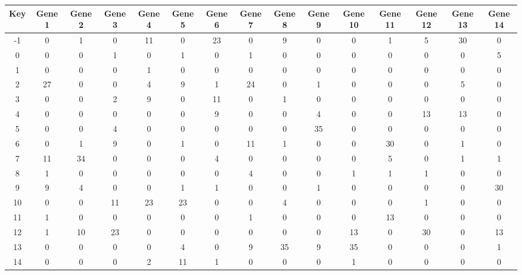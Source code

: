 \begin{tabular}{|c|c|c|c|c|c|c|c|c|c|c|c|c|c|c|}
\hline
Key & Gene 1 & Gene 2 & Gene 3 & Gene 4 & Gene 5 & Gene 6 & Gene 7 & Gene 8 & Gene 9 & Gene 10 & Gene 11 & Gene 12 & Gene 13 & Gene 14 \\
\hline
-1 & 0 & 1 & 0 & 11 & 0 & 23 & 0 & 9 & 0 & 0 & 1 & 5 & 30 & 0 \\
0 & 0 & 0 & 1 & 0 & 1 & 0 & 1 & 0 & 0 & 0 & 0 & 0 & 0 & 5 \\
1 & 0 & 0 & 0 & 1 & 0 & 0 & 0 & 0 & 0 & 0 & 0 & 0 & 0 & 0 \\
2 & 27 & 0 & 0 & 4 & 9 & 1 & 24 & 0 & 1 & 0 & 0 & 0 & 5 & 0 \\
3 & 0 & 0 & 2 & 9 & 0 & 11 & 0 & 1 & 0 & 0 & 0 & 0 & 0 & 0 \\
4 & 0 & 0 & 0 & 0 & 0 & 9 & 0 & 0 & 4 & 0 & 0 & 13 & 13 & 0 \\
5 & 0 & 0 & 4 & 0 & 0 & 0 & 0 & 0 & 35 & 0 & 0 & 0 & 0 & 0 \\
6 & 0 & 1 & 9 & 0 & 1 & 0 & 11 & 1 & 0 & 0 & 30 & 0 & 1 & 0 \\
7 & 11 & 34 & 0 & 0 & 0 & 4 & 0 & 0 & 0 & 0 & 5 & 0 & 1 & 1 \\
8 & 1 & 0 & 0 & 0 & 0 & 0 & 4 & 0 & 0 & 1 & 1 & 1 & 0 & 0 \\
9 & 9 & 4 & 0 & 0 & 1 & 1 & 0 & 0 & 1 & 0 & 0 & 0 & 0 & 30 \\
10 & 0 & 0 & 11 & 23 & 23 & 0 & 0 & 4 & 0 & 0 & 0 & 1 & 0 & 0 \\
11 & 1 & 0 & 0 & 0 & 0 & 0 & 1 & 0 & 0 & 0 & 13 & 0 & 0 & 0 \\
12 & 1 & 10 & 23 & 0 & 0 & 0 & 0 & 0 & 0 & 13 & 0 & 30 & 0 & 13 \\
13 & 0 & 0 & 0 & 0 & 4 & 0 & 9 & 35 & 9 & 35 & 0 & 0 & 0 & 1 \\
14 & 0 & 0 & 0 & 2 & 11 & 1 & 0 & 0 & 0 & 1 & 0 & 0 & 0 & 0 \\
\hline
\end{tabular}